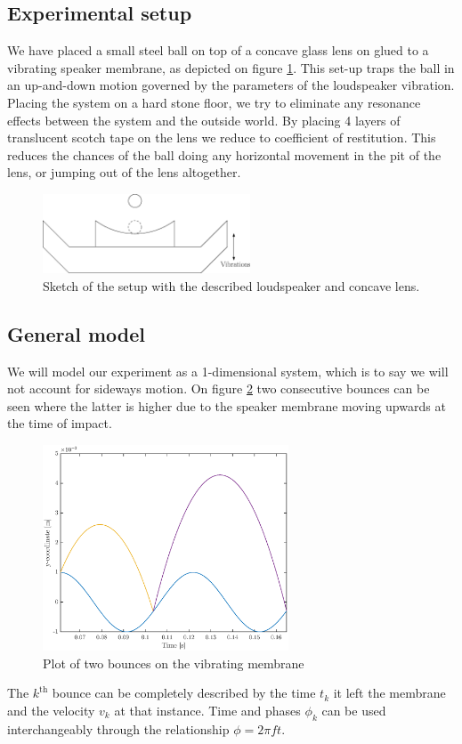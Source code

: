 \documentclass[12pt,oneside,a4paper]{article}
\numberwithin{equation}{section}
\begin{document}
{{{{\subsection{Experimental setup}
We have placed a small steel ball on top of a concave glass lens on glued to a vibrating speaker membrane, as depicted on figure \ref{sketch}. This set-up traps the ball in an up-and-down motion governed by the parameters of the loudspeaker vibration. Placing the system on a hard stone floor, we try to eliminate any resonance effects between the system and the outside world. By placing 4 layers of translucent scotch tape on the lens we reduce to coefficient of restitution. This reduces the chances of the ball doing any horizontal movement in the pit of the lens, or jumping out of the lens altogether. 
\begin{figure}[h]
	\centering
	\includegraphics[width=0.55\textwidth]{speaker2}
	\caption{Sketch of the setup with the described loudspeaker and concave lens.}
	\label{sketch}
\end{figure}
\subsection{General model}
We will model our experiment as a 1-dimensional system, which is to say we will not 
account for sideways motion. On figure \ref{bounces} two consecutive bounces 
can be seen where the latter is higher due to the speaker membrane moving upwards at the 
time of impact.
\begin{figure}[h]
	\centering
	\includegraphics[width=0.65\textwidth]{Figures/bounceplot.eps}
	\caption{Plot of two bounces on the vibrating membrane}
	\label{bounces}
\end{figure}
The $k^{\text{th}}$ bounce can be completely described by the time $t_k$ it left the membrane and the velocity $v_k$ at that instance. Time and phases $\phi_k$ can be used interchangeably through the relationship $\phi=2\pi f t$.

}}}}
\end{document}
